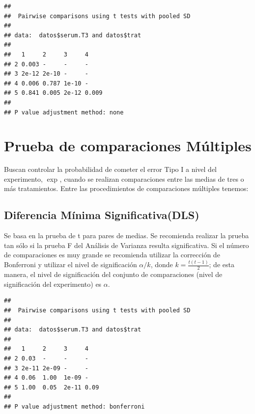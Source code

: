 \documentclass[]{book}
\newenvironment{Shaded}{\begin{snugshade}}{\end{snugshade}}
\newcommand{\KeywordTok}[1]{\textcolor[rgb]{0.13,0.29,0.53}{\textbf{#1}}}
\newcommand{\DataTypeTok}[1]{\textcolor[rgb]{0.13,0.29,0.53}{#1}}
\newcommand{\StringTok}[1]{\textcolor[rgb]{0.31,0.60,0.02}{#1}}
\newcommand{\OperatorTok}[1]{\textcolor[rgb]{0.81,0.36,0.00}{\textbf{#1}}}
\newcommand{\NormalTok}[1]{#1}
\begin{document}
\begin{verbatim}
## 
##  Pairwise comparisons using t tests with pooled SD 
## 
## data:  datos$serum.T3 and datos$trat 
## 
##   1     2     3     4    
## 2 0.003 -     -     -    
## 3 2e-12 2e-10 -     -    
## 4 0.006 0.787 1e-10 -    
## 5 0.841 0.005 2e-12 0.009
## 
## P value adjustment method: none
\end{verbatim}

\section{Prueba de comparaciones
Múltiples}\label{prueba-de-comparaciones-multiples}

Buscan controlar la probabilidad de cometer el error Tipo I a nivel del
experimento, exp , cuando se realizan comparaciones entre las medias de
tres o más tratamientos. Entre las procedimientos de comparaciones
múltiples tenemos:

\subsection{Diferencia Mínima
Significativa(DLS)}\label{diferencia-minima-significativadls}

Se basa en la prueba de t para pares de medias. Se recomienda realizar
la prueba tan sólo si la prueba F del Análisis de Varianza resulta
significativa. Si el número de comparaciones es muy grande se recomienda
utilizar la corrección de Bonferroni y utilizar el nivel de
significación \(\alpha/k\), donde \(k=\frac{t(t-1)}{2}\); de esta
manera, el nivel de significación del conjunto de comparaciones (nivel
de significación del experimento) es \(\alpha\).

\begin{Shaded}
\end{Shaded}

\begin{verbatim}
## 
##  Pairwise comparisons using t tests with pooled SD 
## 
## data:  datos$serum.T3 and datos$trat 
## 
##   1     2     3     4   
## 2 0.03  -     -     -   
## 3 2e-11 2e-09 -     -   
## 4 0.06  1.00  1e-09 -   
## 5 1.00  0.05  2e-11 0.09
## 
## P value adjustment method: bonferroni
\end{verbatim}
\end{document}
